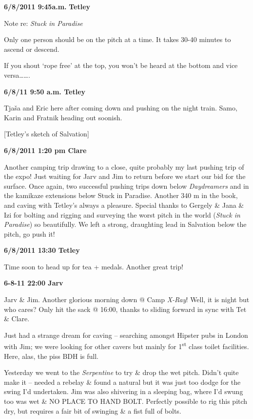 \textbf{6/8/2011 9:45a.m.} \textbf{Tetley}

Note re: \emph{Stuck in Paradise}

Only one person should be on the pitch at a time. It takes 30-40 minutes
to ascend or descend.

If you shout `rope free' at the top, you won't be heard at the bottom
and vice versa\ldots{}\ldots{}.

\textbf{6/8/11 9:50 a.m. Tetley}

Tjaša and Eric here after coming down and pushing on the night train.
Samo, Karin and Fratnik heading out soonish.

{[}Tetley's sketch of Salvation{]}

\textbf{6/8/2011 1:20 pm Clare}

Another camping trip drawing to a close, quite probably my last pushing
trip of the expo! Just waiting for Jarv and Jim to return before we
start our bid for the surface. Once again, two successful pushing trips
down below \emph{Daydreamers} and in the kamikaze extensions below Stuck
in Paradise. Another 340 m in the book, and caving with Tetley's always
a pleasure. Special thanks to Gergely \& Jana \& Izi for bolting and
rigging and surveying the worst pitch in the world (\emph{Stuck in
Paradise}) so beautifully. We left a strong, draughting lead in
Salvation below the pitch, go push it!

\textbf{6/8/2011 13:30 Tetley}

Time soon to head up for tea + medals. Another great trip!

\textbf{6-8-11 22:00 Jarv}

Jarv \& Jim. Another glorious morning down @ Camp \emph{X-Ray}! Well, it
is night but who cares? Only hit the sack @ 16:00, thanks to sliding
forward in sync with Tet \& Clare.

Just had a strange dream for caving -- searching amongst Hipster pubs in
London with Jim; we were looking for other cavers but mainly for
1\textsuperscript{st} class toilet facilities. Here, alas, the piss BDH
is full.

Yesterday we went to the \emph{Serpentine} to try \& drop the wet pitch.
Didn't quite make it -- needed a rebelay \& found a natural but it was
just too dodge for the swing I'd undertaken. Jim was also shivering in a
sleeping bag, where I'd swung too was wet \& NO PLACE TO HAND BOLT.
Perfectly possible to rig this pitch dry, but requires a fair bit of
swinging \& a fist full of bolts.

